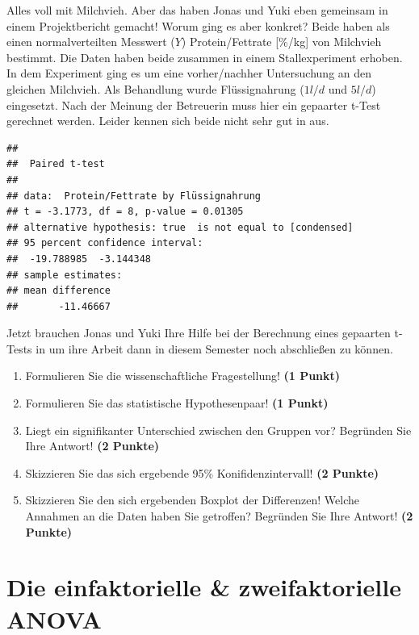 \documentclass[a4paper, 9pt]{scrartcl}\usepackage[]{graphicx}\usepackage[]{xcolor}
\makeatletter
\newenvironment{kframe}{%
 \def\at@end@of@kframe{}%
 \ifinner\ifhmode%
  \def\at@end@of@kframe{\end{minipage}}%
  \begin{minipage}{\columnwidth}%
 \fi\fi%
 \def\FrameCommand##1{\hskip\@totalleftmargin \hskip-\fboxsep
 \colorbox{shadecolor}{##1}\hskip-\fboxsep
     \hskip-\linewidth \hskip-\@totalleftmargin \hskip\columnwidth}%
 \MakeFramed {\advance\hsize-\width
   \@totalleftmargin\z@ \linewidth\hsize
   \@setminipage}}%
 {\par\unskip\endMakeFramed%
 \at@end@of@kframe}
\newenvironment{knitrout}{}{} %
\makeatother
\begin{document}
Alles voll mit Milchvieh. Aber das haben Jonas und Yuki eben gemeinsam in einem Projektbericht gemacht! Worum ging es aber konkret? Beide haben als einen normalverteilten Messwert ($Y$) Protein/Fettrate [\%/kg] von Milchvieh bestimmt. Die Daten haben beide zusammen in einem Stallexperiment erhoben. In dem Experiment ging es um eine vorher/nachher Untersuchung an den gleichen Milchvieh. Als Behandlung wurde Flüssignahrung ($1l/d$ und $5l/d$) eingesetzt. Nach der Meinung der Betreuerin muss hier ein gepaarter t-Test gerechnet werden. Leider kennen sich beide nicht sehr gut in \Rlogo aus.

\begin{knitrout}
\color{fgcolor}\begin{kframe}
\begin{verbatim}
## 
## 	Paired t-test
## 
## data:  Protein/Fettrate by Flüssignahrung
## t = -3.1773, df = 8, p-value = 0.01305
## alternative hypothesis: true  is not equal to [condensed]
## 95 percent confidence interval:
##  -19.788985  -3.144348
## sample estimates:
## mean difference 
##       -11.46667
\end{verbatim}
\end{kframe}
\end{knitrout}

Jetzt brauchen Jonas und Yuki Ihre Hilfe bei der Berechnung eines gepaarten t-Tests in \Rlogo um ihre Arbeit dann in diesem Semester noch abschließen zu können.

\begin{enumerate}
  \item Formulieren Sie die wissenschaftliche Fragestellung! \textbf{(1 Punkt)}
  \item Formulieren Sie das statistische Hypothesenpaar! \textbf{(1 Punkt)}
\item Liegt ein signifikanter Unterschied zwischen den Gruppen vor?
  Begründen Sie Ihre Antwort! \textbf{(2 Punkte)}
\item Skizzieren Sie das sich ergebende 95\% Konifidenzintervall! \textbf{(2 Punkte)}
\item Skizzieren Sie den sich ergebenden Boxplot der Differenzen! Welche Annahmen an die Daten haben Sie getroffen? Begründen Sie Ihre Antwort! \textbf{(2 Punkte)} 
\end{enumerate}
 
\clearpage
\part{Die einfaktorielle \& zweifaktorielle ANOVA}
\end{document}

